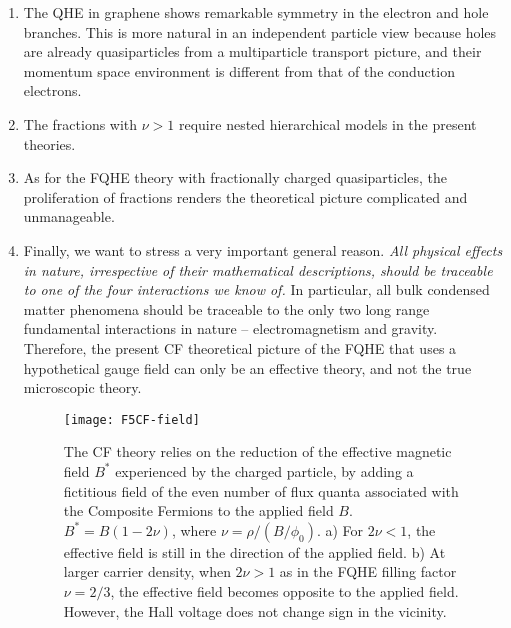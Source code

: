 \documentclass[aps,preprint,12pt,tightenlines]{revtex4}%
\begin{document}
\begin{enumerate}
\item The QHE in graphene shows remarkable symmetry in the electron and hole
branches. This is more natural in an independent particle view because holes
are already quasiparticles from a multiparticle transport picture, and their
momentum space environment is different from that of the conduction electrons.

\item The fractions with $\nu>1$ require nested hierarchical models in the
present theories.

\item As for the FQHE theory with fractionally charged quasiparticles, the
proliferation of fractions renders the theoretical picture complicated and unmanageable.

\item Finally, we want to stress a very important general reason. \emph{All
physical effects in nature, irrespective of their mathematical descriptions,
should be traceable to one of the four interactions we know of.} In
particular, all bulk condensed matter phenomena should be traceable to the
only two long range fundamental interactions in nature -- electromagnetism and
gravity. Therefore, the present CF theoretical picture of the FQHE that uses a
hypothetical gauge field can only be an effective theory, and not the true
microscopic theory.

\begin{figure}
	\centering
	\texttt{[image: F5CF-field]}
	\caption{The CF theory relies on the reduction of the effective magnetic field $B^{\ast}$ experienced by the charged particle, by adding a fictitious field of the even number of flux quanta associated with the Composite Fermions to the applied field $B$. $B^{\ast}=B\left( 1-2\nu\right) $, where $\nu =\rho/\left( B/\phi_{0}\right) $. a) For $2\nu<1$, the effective field is still in the direction of the applied field. b) At larger carrier density, when $2\nu>1$ as in the FQHE filling factor $\nu=2/3$, the effective field becomes opposite to the applied field. However, the Hall voltage does not change sign in the vicinity.}
	\label{fig:cf-field}
\end{figure}


\end{enumerate}
\end{document}
